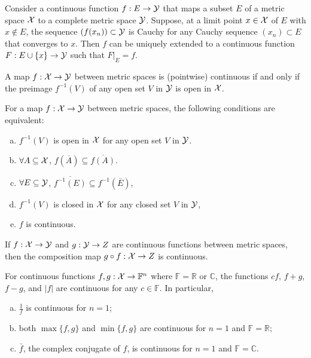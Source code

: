 \begin{thm}
  \label{thm:continuousExtPoint}
  Consider a continuous function $f: E \rightarrow {\cal Y}$ 
  that maps a subset $E$ of a metric space ${\cal X}$
  to a complete metric space ${\cal Y}$.
  Suppose, at a limit point $x\in {\cal X}$ of $E$ with $x\not\in E$, 
  the sequence $(f(x_n))\subset {\cal Y}$ is Cauchy
  for any Cauchy sequence $(x_n)\subset E$ that converges to $x$. 
  Then $f$ can be uniquely extended to a continuous function
  $F: E\cup\{x\}\rightarrow {\cal Y}$ such that
  $F|_{E} = f$.
\end{thm}

\begin{thm}
  \label{thm:contMapOpenPreimage}
  A map $f:{\cal X}\rightarrow {\cal Y}$ between metric spaces
  is (pointwise) continuous if and only if
  the preimage $f^{-1}(V)$ of any open set $V$ in ${\cal Y}$
  is open in ${\cal X}$.
\end{thm}

\begin{thm}
  \label{thm:contMapConditions}
  For a map $f:{\cal X}\rightarrow {\cal Y}$ between metric spaces,
  the following conditions are equivalent:
  \begin{enumerate}[(a)]\itemsep0em
  \item $f^{-1}(V)$ is open in ${\cal X}$ for any open set $V$ in ${\cal Y}$.
  \item $\forall A\subseteq {\cal X}$,
    $f(\overline{A})\subseteq \overline{f(A)}$.
  \item $\forall E\subseteq {\cal Y}$,
    $\overline{f^{-1}(E)}\subseteq f^{-1}(\overline{E})$, 
  \item $f^{-1}(V)$ is closed in ${\cal X}$
    for any closed set $V$ in ${\cal Y}$,
  \item $f$ is continuous. 
  \end{enumerate}
\end{thm}

\begin{lem}
  \label{lem:compositionMapIsContinuous}
  If $f:{\cal X}\rightarrow {\cal Y}$ and $g:{\cal Y}\rightarrow Z$
  are continuous functions between metric spaces,
  then the composition map $g\circ f: {\cal X}\rightarrow Z$
  is continuous.
\end{lem}

\begin{lem}
  \label{lem:elementaryMapIsContinuousNF}
  For continuous functions $f,g:{\cal X}\rightarrow\mathbb{F}^n$ 
  where $\mathbb{F}=\mathbb{R}$ or $\mathbb{C}$, 
  the functions $cf$, $f+g$, $f-g$, and $|f|$
  are continuous for any $c\in\mathbb{F}$.
  In particular, 
  \begin{enumerate}[(a)]\itemsep0em
  \item $\frac{1}{f}$ is continuous for $n=1$;
  \item both $\max\{f,g\}$ and $\min\{f,g\}$
    are continuous for $n=1$ and $\mathbb{F}=\mathbb{R}$;
  \item $\bar{f}$, the complex conjugate of $f$, is continuous
    for $n=1$ and $\mathbb{F}=\mathbb{C}$. 
  \end{enumerate}
\end{lem}

